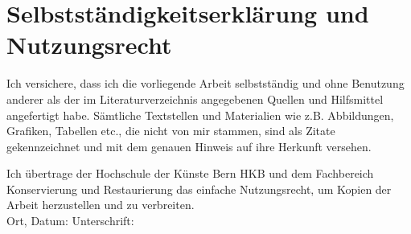 \chapter{Selbstständigkeitserklärung und Nutzungsrecht}

Ich versichere, dass ich die vorliegende Arbeit selbstständig und ohne Benutzung anderer als der im Literaturverzeichnis angegebenen Quellen und Hilfsmittel angefertigt habe. Sämtliche Textstellen und Materialien wie z.B. Abbildungen, Grafiken, Tabellen etc., die nicht von mir stammen, sind als Zitate gekennzeichnet und mit dem genauen Hinweis auf ihre Herkunft versehen.

Ich übertrage der Hochschule der Künste Bern HKB und dem Fachbereich Konservierung und Restaurierung das einfache Nutzungsrecht, um Kopien der Arbeit herzustellen und zu verbreiten.\\



Ort, Datum: \hspace*{35mm} Unterschrift:











